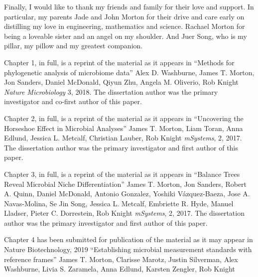 \begin{frontmatter}
\begin{acknowledgements}
  Finally, I would like to thank my friends and family for their love and support.
  In particular, my parents Jade and John Morton for their drive and care early
  on distilling my love in engineering, mathematics and science.  Rachael Morton
  for being a loveable sister and an angel on my shoulder.  And Juer
  Song, who is my pillar, my pillow and my greatest companion.

  Chapter 1, in full, is a reprint of the material as it appears in
  ``Methods for phylogenetic analysis of microbiome data''
  Alex D. Washburne, James T. Morton, Jon Sanders, Daniel McDonald,
  Qiyun Zhu, Angela M. Oliverio, Rob Knight  \emph{Nature Microbiology} 3, 2018. The dissertation author was the primary investigator and co-first author of this paper.

  Chapter 2, in full, is a reprint of the material as it appears in
  ``Uncovering the Horseshoe Effect in Microbial Analyses''
  James T. Morton, Liam Toran, Anna Edlund, Jessica L. Metcalf,
  Christian Lauber, Rob Knight \emph{mSystems}, 2, 2017.  The dissertation author was the primary investigator and first author of this paper.

  Chapter 3, in full, is a reprint of the material as it appears in
  ``Balance Trees Reveal Microbial Niche Differentiation''
  James T. Morton, Jon Sanders, Robert A. Quinn, Daniel McDonald, Antonio Gonzalez,
  Yoshiki Vázquez-Baeza, Jose A. Navas-Molina, Se Jin Song, Jessica L. Metcalf,
  Embriette R. Hyde, Manuel Lladser, Pieter C. Dorrestein, Rob Knight
  \emph{mSystems}, 2, 2017.  The dissertation author was the primary investigator and first author of this paper.

  Chapter 4 has been submitted for publication of the material as it may appear in
  Nature Biotechnology, 2019 ``Establishing microbial measurement standards with reference frames''
  James T. Morton,  Clarisse Marotz, Justin Silverman, Alex Washburne, Livia S. Zaramela,
  Anna Edlund, Karsten Zengler, Rob Knight


\end{acknowledgements}


%
%
\begin{vitapage}
\begin{vita}


\end{vita}
\end{vitapage}
\end{frontmatter}
